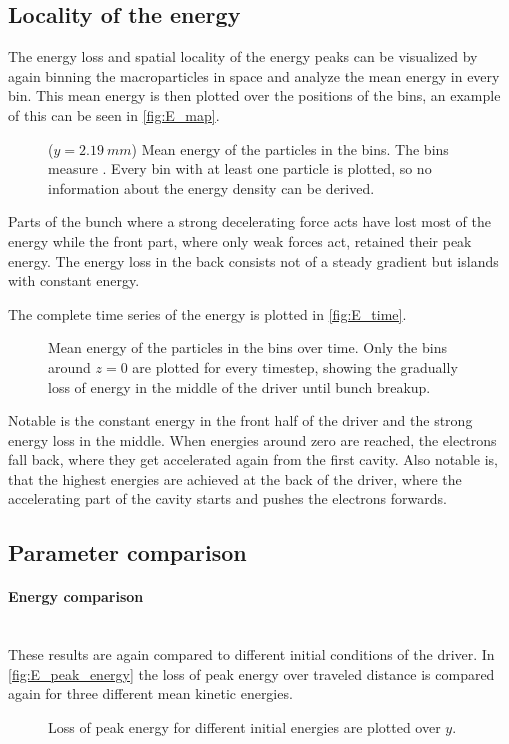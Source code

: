 \documentclass[bachelor_thesis]{subfiles}
\begin{document}
\subsection{Locality of the energy}\label{chap:loc_E}
The energy loss and spatial locality of the energy peaks can be visualized by again binning the macroparticles in space and analyze the mean energy in every bin. This mean energy is then plotted over the positions of the bins,
an example of this can be seen in \autoref{fig:E_map}. 
\begin{figure}
	\centering
	\missingfigure{}
	\caption{($y=\qty{2.19}{mm}$) Mean energy of the particles in the bins. The bins measure . Every bin with at least one particle is plotted, so no information about the energy density can be derived.}
	\label{fig:E_map}
\end{figure}

Parts of the bunch where a strong decelerating force acts have lost most of the energy while the front part, where only weak forces act, retained their peak energy. The energy loss in the back consists not of a steady gradient but islands with constant energy.

The complete time series of the energy is plotted in \autoref{fig:E_time}.
\begin{figure}
	\centering
	\missingfigure{}
	\caption{Mean energy of the particles in the bins over time. Only the bins around $z=0$ are plotted for every timestep, showing the gradually loss of energy in the middle of the driver until bunch breakup.}
	\label{fig:E_time}
\end{figure}
Notable is the constant energy in the front half of the driver and the strong energy loss in the middle. When energies around zero are reached, the electrons fall back, where they get accelerated again from the first cavity.
Also notable is, that the highest energies are achieved at the back of the driver, where the accelerating part of the cavity starts and pushes the electrons forwards.

\subsection{Parameter comparison}
\paragraph*{Energy comparison}\hspace{0pt} \\
These results are again compared to different initial conditions of the driver. In \autoref{fig:E_peak_energy} the loss of peak energy over traveled distance is compared again for three different mean kinetic energies.
\begin{figure}
	\centering
	\missingfigure{}
	\caption{Loss of peak energy for different initial energies are plotted over $y$.}
	\label{fig:E_peak_energy}
\end{figure}
\end{document}
